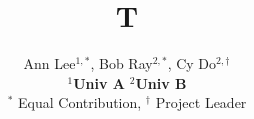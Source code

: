 \documentclass{article}
\begin{document}
\title{T}
\author{Ann Lee$^{1,*}$, Bob Ray$^{2,*}$, Cy Do$^{2,\dagger}$\\
\textbf{$^1$Univ A}  \textbf{$^2$Univ B}\\
$^*$ Equal Contribution, $^\dagger$ Project Leader}
\maketitle
\end{document}
